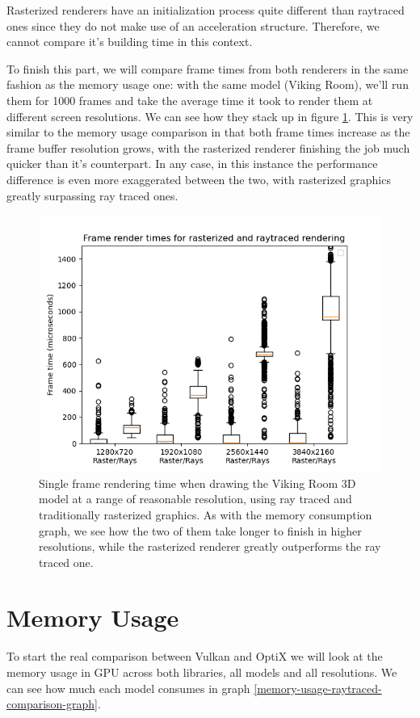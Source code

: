 Rasterized renderers have an initialization process quite different than raytraced ones since they do not make use of an acceleration structure. Therefore, we cannot compare it's building time in this context.

To finish this part, we will compare frame times from both renderers in the same fashion as the memory usage one: with the same model (Viking Room), we'll run them for 1000 frames and take the average time it took to render them at different screen resolutions. We can see how they stack up in figure \ref{frametimes-comparison-graph}. This is very similar to the memory usage comparison in that both frame times increase as the frame buffer resolution grows, with the rasterized renderer finishing the job much quicker than it's counterpart. In any case, in this instance the performance difference is even more exaggerated between the two, with rasterized graphics greatly surpassing ray traced ones.

\begin{figure}[hbt!]
    \centering
    \includegraphics[width=1.0\textwidth]{figuras/vulkan-frametimes-comparison.png}
    \caption{Single frame rendering time when drawing the Viking Room 3D model at a range of reasonable resolution, using ray traced and traditionally rasterized graphics. As with the memory consumption graph, we see how the two of them take longer to finish in higher resolutions, while the rasterized renderer greatly outperforms the ray traced one.}
    \label{frametimes-comparison-graph}
\end{figure}


\clearpage
\section{Memory Usage}
To start the real comparison between Vulkan and OptiX we will look at the memory usage in GPU across both libraries, all models and all resolutions. We can see how much each model consumes in graph \ref{memory-usage-raytraced-comparison-graph}.

